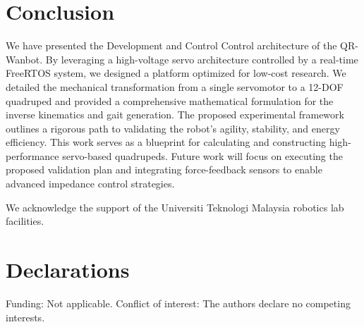 \documentclass[pdflatex,sn-mathphys-num]{sn-jnl}%
\theoremstyle{thmstyleone}%
\theoremstyle{thmstyletwo}%
\theoremstyle{thmstylethree}%
\begin{document}
\section{Conclusion}\label{sec6}
We have presented the Development and Control Control architecture of the QR-Wanbot. By leveraging a high-voltage servo architecture controlled by a real-time FreeRTOS system, we designed a platform optimized for low-cost research. We detailed the mechanical transformation from a single servomotor to a 12-DOF quadruped and provided a comprehensive mathematical formulation for the inverse kinematics and gait generation. The proposed experimental framework outlines a rigorous path to validating the robot's agility, stability, and energy efficiency. This work serves as a blueprint for calculating and constructing high-performance servo-based quadrupeds. Future work will focus on executing the proposed validation plan and integrating force-feedback sensors to enable advanced impedance control strategies.


\backmatter

We acknowledge the support of the Universiti Teknologi Malaysia robotics lab facilities.

\section*{Declarations}
Funding: Not applicable. Conflict of interest: The authors declare no competing interests.
\end{document}
